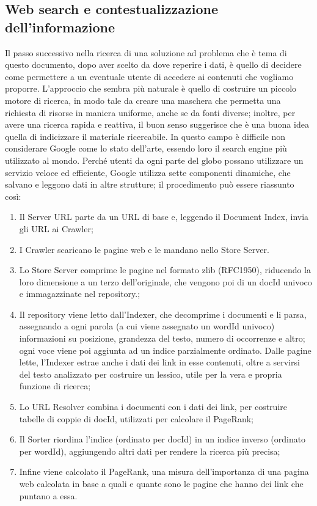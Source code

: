 \documentclass[sigproc-sp.tex]{subfiles}
\begin{document}
\subsection{Web search e contestualizzazione dell’informazione} 
Il passo successivo nella ricerca di una soluzione ad problema che è tema di questo documento, dopo aver scelto da dove reperire i dati, è quello di decidere come permettere a un eventuale utente di accedere ai contenuti che vogliamo proporre. L’approccio che sembra più naturale è quello di costruire un piccolo motore di ricerca, in modo tale da creare una maschera che permetta una richiesta di risorse in maniera uniforme, anche se da fonti diverse; inoltre, per avere una ricerca rapida e reattiva, il buon senso suggerisce che è una buona idea quella di indicizzare il materiale ricercabile.
In questo campo è difficile non considerare Google come lo stato dell’arte, essendo loro il search engine più utilizzato al mondo. Perché utenti da ogni parte del globo possano utilizzare un servizio veloce ed efficiente, Google utilizza sette componenti dinamiche, che salvano e leggono dati in altre strutture; il procedimento può essere riassunto così:
\begin{enumerate}
  \item Il Server URL parte da un URL di base e, leggendo il Document Index, invia gli URL ai Crawler;
  \item I Crawler scaricano le pagine web e le mandano nello Store Server.
  \item Lo Store Server comprime le pagine nel formato zlib (RFC1950), riducendo la loro dimensione a un terzo dell’originale, che vengono poi di un docId univoco e immagazzinate nel repository.;
  \item Il repository viene letto dall’Indexer, che decomprime i documenti e li parsa, assegnando a ogni parola (a cui viene assegnato un wordId univoco) informazioni su posizione, grandezza del testo, numero di occorrenze e altro; ogni voce viene poi aggiunta ad un indice parzialmente ordinato. Dalle pagine lette, l’Indexer estrae anche i dati dei link in esse contenuti, oltre a servirsi del testo analizzato per costruire un lessico, utile per la vera e propria funzione di ricerca;
  \item Lo URL Resolver combina i documenti con i dati dei link, per costruire tabelle di coppie di docId, utilizzati per calcolare il PageRank;
  \item Il Sorter riordina l’indice (ordinato per docId) in un indice inverso (ordinato per wordId), aggiungendo altri dati per rendere la ricerca più precisa;
  \item Infine viene calcolato il PageRank, una misura dell’importanza di una pagina web calcolata in base a quali e quante sono le pagine che hanno dei link che puntano a essa.
\end{enumerate}
\end{document}
